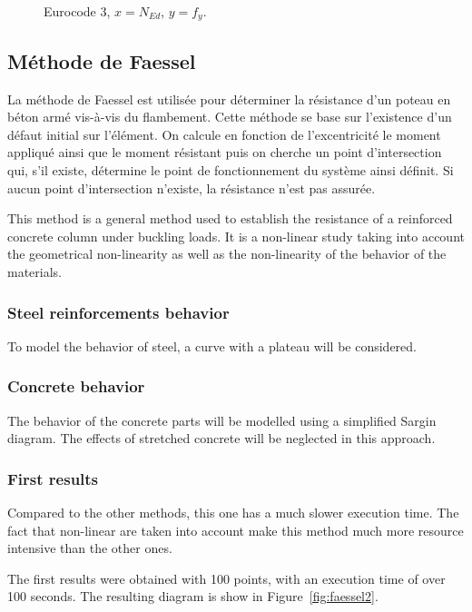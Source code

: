 \documentclass{report}
\begin{document}
\begin{figure}[!ht]
    \centering
    
    \caption{Eurocode 3, $x=N_{Ed}$, $y=f_y$.}\label{fig:res2}
\end{figure}

\subsection{Méthode de Faessel}

La méthode de Faessel est utilisée pour déterminer la résistance d'un poteau en béton armé vis-à-vis du flambement. Cette méthode se base sur l'existence d'un défaut initial sur l'élément. On calcule en fonction de l'excentricité le moment appliqué ainsi que le moment résistant puis on cherche un point d'intersection qui, s'il existe, détermine le point de fonctionnement du système ainsi définit. Si aucun point d'intersection n'existe, la résistance n'est pas assurée.

This method is a general method used to establish the resistance of a reinforced concrete column under buckling loads.
It is a non-linear study  taking into account the geometrical non-linearity as well as the non-linearity of the behavior of the materials.

\subsubsection{Steel reinforcements behavior}
To model the behavior of steel, a curve with a plateau will be considered.

\subsubsection{Concrete behavior}
The behavior of the concrete parts will be modelled using a simplified Sargin diagram.
The effects of stretched concrete will be neglected in this approach.

\subsubsection{First results}
Compared to the other methods, this one has a much slower execution time. The fact that non-linear are taken into account make this method much more resource intensive than the other ones.

The first results were obtained with 100 points, with an execution time of over 100 seconds. The resulting diagram is show in Figure~\ref{fig:faessel2}.
\end{document}

